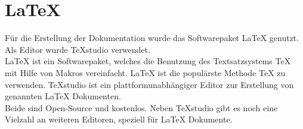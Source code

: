 \section{LaTeX}
Für die Erstellung der Dokumentation wurde das Softwarepaket LaTeX genutzt. Als Editor wurde TeXstudio verwendet.\\
LaTeX ist ein Softwarepaket, welches die Benutzung des Textsatzsystems TeX mit Hilfe von Makros vereinfacht.
LaTeX ist die populärste Methode TeX zu verwenden.
TeXstudio ist ein plattformunabhängiger Editor zur Erstellung von genannten LaTeX Dokumenten.\\
Beide sind Open-Source und kostenlos. Neben TeXstudio gibt es noch eine Vielzahl an weiteren Editoren, speziell für LaTeX Dokumente.

